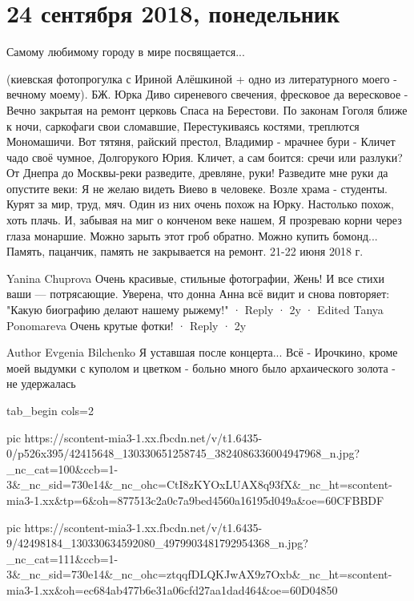  
 
 
 
 
\section{24 сентября 2018, понедельник}
\label{sec:24_09_2018}

Самому любимому городу в мире посвящается...

(киевская фотопрогулка с Ириной Алёшкиной + одно из литературного моего - вечному моему).
БЖ. Юрка
Диво сиреневого свечения, фресковое да вересковое -
Вечно закрытая на ремонт церковь Спаса на Берестови.
По законам Гоголя ближе к ночи, саркофаги свои сломавшие,
Перестукиваясь костями, треплются Мономашичи.
Вот тятяня, райский престол, Владимир - мрачнее бури -
Кличет чадо своё чумное, Долгорукого Юрия.
Кличет, а сам боится: сречи или разлуки?
От Днепра до Москвы-реки разведите, древляне, руки!
Разведите мне руки да опустите веки:
Я не желаю видеть Виево в человеке.
Возле храма - студенты. Курят за мир, труд, мяч.
Один из них очень похож на Юрку. 
Настолько похож, хоть плачь.
И, забывая на миг о конченом веке нашем,
Я прозреваю корни через глаза монаршие.
Можно зарыть этот гроб обратно. Можно купить бомонд...
Память, пацанчик, память не закрывается на ремонт.
21-22 июня 2018 г.

Yanina Chuprova
Очень красивые, стильные фотографии, Жень! И все стихи ваши — потрясающие. Уверена, что донна Анна всё видит и снова повторяет: "Какую биографию делают нашему рыжему!"
 · Reply · 2y · Edited
Tanya Ponomareva
Очень крутые фотки!
 · Reply · 2y

Author
Evgenia Bilchenko
Я уставшая после концерта... Всё - Ирочкино, кроме моей выдумки с куполом и цветком - больно много было архаического золота - не удержалась


\ifcmt
  tab_begin cols=2

     pic https://scontent-mia3-1.xx.fbcdn.net/v/t1.6435-0/p526x395/42415648_130330651258745_3824086336004947968_n.jpg?_nc_cat=100&ccb=1-3&_nc_sid=730e14&_nc_ohc=CtI8zKYOxLUAX8q93fX&_nc_ht=scontent-mia3-1.xx&tp=6&oh=877513c2a0c7a9bed4560a16195d049a&oe=60CFBBDF

     pic https://scontent-mia3-1.xx.fbcdn.net/v/t1.6435-9/42498184_130330634592080_4979903481792954368_n.jpg?_nc_cat=111&ccb=1-3&_nc_sid=730e14&_nc_ohc=ztqqfDLQKJwAX9z7Oxb&_nc_ht=scontent-mia3-1.xx&oh=ec684ab477b6e31a06cfd27aa1dad464&oe=60D04850

